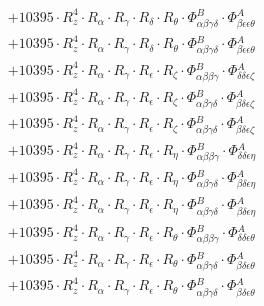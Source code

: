 \documentclass{article}
\begin{document}
\begin{subequations}
\begin{gather}
\begin{array}{c}
 \\[0.2em] 		 + 10395 \cdot R_{z}^{4} \cdot R_{\alpha{}} \cdot R_{\gamma{}} \cdot R_{\delta{}} \cdot R_{\theta{}} \cdot \Phi{}^{B}_{\alpha{}\beta{}\gamma{}\delta{}} \cdot \Phi{}^{A}_{\beta{}\epsilon{}\epsilon{}\theta{}} 
 \\[0.2em] 		 + 10395 \cdot R_{z}^{4} \cdot R_{\alpha{}} \cdot R_{\gamma{}} \cdot R_{\delta{}} \cdot R_{\theta{}} \cdot \Phi{}^{B}_{\alpha{}\beta{}\gamma{}\delta{}} \cdot \Phi{}^{A}_{\beta{}\epsilon{}\epsilon{}\theta{}} 
 \\[0.2em] 		 + 10395 \cdot R_{z}^{4} \cdot R_{\alpha{}} \cdot R_{\gamma{}} \cdot R_{\epsilon{}} \cdot R_{\zeta{}} \cdot \Phi{}^{B}_{\alpha{}\beta{}\beta{}\gamma{}} \cdot \Phi{}^{A}_{\delta{}\delta{}\epsilon{}\zeta{}} 
 \\[0.2em] 		 + 10395 \cdot R_{z}^{4} \cdot R_{\alpha{}} \cdot R_{\gamma{}} \cdot R_{\epsilon{}} \cdot R_{\zeta{}} \cdot \Phi{}^{B}_{\alpha{}\beta{}\gamma{}\delta{}} \cdot \Phi{}^{A}_{\beta{}\delta{}\epsilon{}\zeta{}} 
 \\[0.2em] 		 + 10395 \cdot R_{z}^{4} \cdot R_{\alpha{}} \cdot R_{\gamma{}} \cdot R_{\epsilon{}} \cdot R_{\zeta{}} \cdot \Phi{}^{B}_{\alpha{}\beta{}\gamma{}\delta{}} \cdot \Phi{}^{A}_{\beta{}\delta{}\epsilon{}\zeta{}} 
 \\[0.2em] 		 + 10395 \cdot R_{z}^{4} \cdot R_{\alpha{}} \cdot R_{\gamma{}} \cdot R_{\epsilon{}} \cdot R_{\eta{}} \cdot \Phi{}^{B}_{\alpha{}\beta{}\beta{}\gamma{}} \cdot \Phi{}^{A}_{\delta{}\delta{}\epsilon{}\eta{}} 
 \\[0.2em] 		 + 10395 \cdot R_{z}^{4} \cdot R_{\alpha{}} \cdot R_{\gamma{}} \cdot R_{\epsilon{}} \cdot R_{\eta{}} \cdot \Phi{}^{B}_{\alpha{}\beta{}\gamma{}\delta{}} \cdot \Phi{}^{A}_{\beta{}\delta{}\epsilon{}\eta{}} 
 \\[0.2em] 		 + 10395 \cdot R_{z}^{4} \cdot R_{\alpha{}} \cdot R_{\gamma{}} \cdot R_{\epsilon{}} \cdot R_{\eta{}} \cdot \Phi{}^{B}_{\alpha{}\beta{}\gamma{}\delta{}} \cdot \Phi{}^{A}_{\beta{}\delta{}\epsilon{}\eta{}} 
 \\[0.2em] 		 + 10395 \cdot R_{z}^{4} \cdot R_{\alpha{}} \cdot R_{\gamma{}} \cdot R_{\epsilon{}} \cdot R_{\theta{}} \cdot \Phi{}^{B}_{\alpha{}\beta{}\beta{}\gamma{}} \cdot \Phi{}^{A}_{\delta{}\delta{}\epsilon{}\theta{}} 
 \\[0.2em] 		 + 10395 \cdot R_{z}^{4} \cdot R_{\alpha{}} \cdot R_{\gamma{}} \cdot R_{\epsilon{}} \cdot R_{\theta{}} \cdot \Phi{}^{B}_{\alpha{}\beta{}\gamma{}\delta{}} \cdot \Phi{}^{A}_{\beta{}\delta{}\epsilon{}\theta{}} 
 \\[0.2em] 		 + 10395 \cdot R_{z}^{4} \cdot R_{\alpha{}} \cdot R_{\gamma{}} \cdot R_{\epsilon{}} \cdot R_{\theta{}} \cdot \Phi{}^{B}_{\alpha{}\beta{}\gamma{}\delta{}} \cdot \Phi{}^{A}_{\beta{}\delta{}\epsilon{}\theta{}} 

\end{array}
\end{gather}
\end{subequations}
\end{document}
